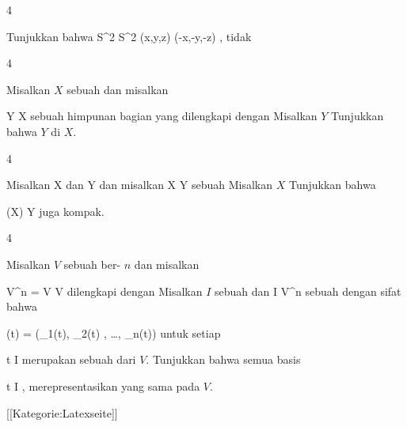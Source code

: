 {4}
{

Tunjukkan bahwa
\maabbeledisp {} {S^2} {S^2
} {(x,y,z)} {(-x,-y,-z)
} {,}
tidak

}
{} {}

{4}
{

Misalkan $X$ sebuah
dan misalkan

\mavergleichskette
{\vergleichskette
{Y
}
{ \subseteq }{ X
}
{  }{
}
{    }{
}
{   }{
}
}
{}{}{}
sebuah himpunan bagian yang dilengkapi dengan
Misalkan $Y$
Tunjukkan bahwa $Y$
di $X$.

}
{} {}

{4}
{

Misalkan
\mathkor {} {X} {dan} {Y} {}
dan misalkan
\maabbdisp {\varphi} { X } { Y
} {}
sebuah
Misalkan $X$
Tunjukkan bahwa

\mavergleichskette
{\vergleichskette
{ \varphi(X)
}
{ \subseteq }{ Y
}
{  }{
}
{    }{
}
{   }{
}
}
{}{}{}
juga kompak.

}
{} {}

{4}
{

Misalkan $V$ sebuah
ber-
$n$ dan misalkan

\mavergleichskette
{\vergleichskette
{ V^n
}
{ = }{ V \times \cdots \times V
}
{  }{
}
{    }{
}
{   }{
}
}
{}{}{}
dilengkapi dengan
Misalkan $I$ sebuah
dan
\maabbdisp {\varphi} { I } { V^n
} {}
sebuah
dengan sifat bahwa

\mavergleichskettedisp
{\vergleichskette
{ \varphi(t)
}
{ =} { (\varphi_1(t), \varphi_2(t) , \ldots , \varphi_n(t))
}
{ } {
}
{ } {
}
{ } {
}
}
{}{}{}
untuk setiap

\mavergleichskette
{\vergleichskette
{ t
}
{ \in }{ I
}
{  }{
}
{    }{
}
{   }{
}
}
{}{}{}
merupakan sebuah
dari $V$. Tunjukkan bahwa semua basis

 {}
 {t \in I} {}
 {} {} {} {,}
merepresentasikan
yang sama pada $V$.

}
{} {}

 [[Kategorie:Latexseite]]
